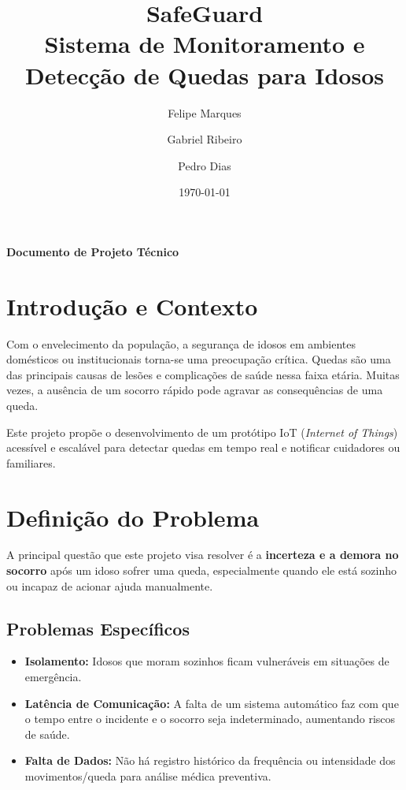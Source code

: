 \documentclass[a4paper,12pt]{article}
\title{\textbf{SafeGuard}\\[0.5em]
\large Sistema de Monitoramento e Detecção de Quedas para Idosos}
\author{
    Felipe Marques \and Gabriel Ribeiro \and Pedro Dias
}
\date{\today}
\begin{document}
\maketitle

\begin{center}
\textbf{Documento de Projeto Técnico}
\end{center}

\vspace{1cm}

\tableofcontents

\newpage

\section{Introdução e Contexto}

Com o envelecimento da população, a segurança de idosos em ambientes domésticos ou institucionais torna-se uma preocupação crítica. Quedas são uma das principais causas de lesões e complicações de saúde nessa faixa etária. Muitas vezes, a ausência de um socorro rápido pode agravar as consequências de uma queda.

Este projeto propõe o desenvolvimento de um protótipo IoT (\textit{Internet of Things}) acessível e escalável para detectar quedas em tempo real e notificar cuidadores ou familiares.

\section{Definição do Problema}

A principal questão que este projeto visa resolver é a \textbf{incerteza e a demora no socorro} após um idoso sofrer uma queda, especialmente quando ele está sozinho ou incapaz de acionar ajuda manualmente.

\subsection{Problemas Específicos}

\begin{itemize}[leftmargin=2cm]
    \item \textbf{Isolamento:} Idosos que moram sozinhos ficam vulneráveis em situações de emergência.
    \item \textbf{Latência de Comunicação:} A falta de um sistema automático faz com que o tempo entre o incidente e o socorro seja indeterminado, aumentando riscos de saúde.
    \item \textbf{Falta de Dados:} Não há registro histórico da frequência ou intensidade dos movimentos/queda para análise médica preventiva.
\end{itemize}
\end{document}
